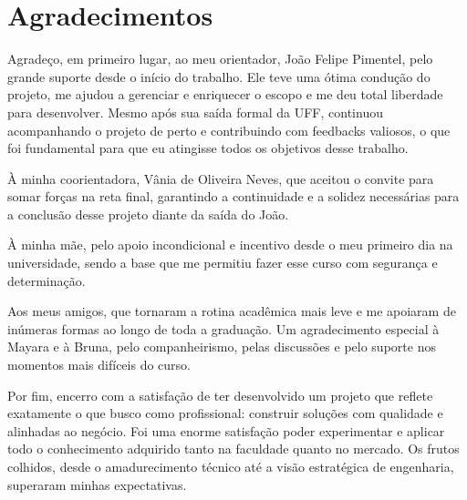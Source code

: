 \documentclass[article,a4paper,12pt,brazil,sumario=tradicional]{abntex2}
\begin{document}
\newpage
\chapter*{Agradecimentos}

Agradeço, em primeiro lugar, ao meu orientador, João Felipe Pimentel, pelo grande suporte desde o início do trabalho. Ele teve uma ótima condução do projeto, me ajudou a gerenciar e enriquecer o escopo e me deu total liberdade para desenvolver. Mesmo após sua saída formal da UFF, continuou acompanhando o projeto de perto e contribuindo com feedbacks valiosos, o que foi fundamental para que eu atingisse todos os objetivos desse trabalho.

À minha coorientadora, Vânia de Oliveira Neves, que aceitou o convite para somar forças na reta final, garantindo a continuidade e a solidez necessárias para a conclusão desse projeto diante da saída do João.

À minha mãe, pelo apoio incondicional e incentivo desde o meu primeiro dia na universidade, sendo a base que me permitiu fazer esse curso com segurança e determinação.

Aos meus amigos, que tornaram a rotina acadêmica mais leve e me apoiaram de inúmeras formas ao longo de toda a graduação. Um agradecimento especial à Mayara e à Bruna, pelo companheirismo, pelas discussões e pelo suporte nos momentos mais difíceis do curso.

Por fim, encerro com a satisfação de ter desenvolvido um projeto que reflete exatamente o que busco como profissional: construir soluções com qualidade e alinhadas ao negócio. Foi uma enorme satisfação poder experimentar e aplicar todo o conhecimento adquirido tanto na faculdade quanto no mercado. Os frutos colhidos, desde o amadurecimento técnico até a visão estratégica de engenharia, superaram minhas expectativas.
\end{document}
